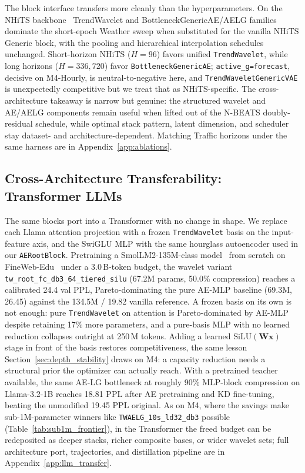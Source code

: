 \documentclass[11pt,a4paper]{article}
\begin{document}
The block interface transfers more cleanly than the hyperparameters. On the NHiTS backbone~\citep{challu2023nhits} TrendWavelet and BottleneckGenericAE/AELG families dominate the short-epoch Weather sweep when substituted for the vanilla NHiTS Generic block, with the pooling and hierarchical interpolation schedules unchanged. Short-horizon NHiTS ($H=96$) favors unified \texttt{TrendWavelet}, while long horizons ($H=336, 720$) favor \texttt{BottleneckGenericAE}; \texttt{active\_g=forecast}, decisive on M4-Hourly, is neutral-to-negative here, and \texttt{TrendWaveletGenericVAE} is unexpectedly competitive but we treat that as NHiTS-specific. The cross-architecture takeaway is narrow but genuine: the structured wavelet and AE/AELG components remain useful when lifted out of the N-BEATS doubly-residual schedule, while optimal stack pattern, latent dimension, and scheduler stay dataset- and architecture-dependent. Matching Traffic horizons under the same harness are in Appendix~\ref{app:ablations}.

\subsection{Cross-Architecture Transferability: Transformer LLMs}
\label{sec:transfer_llm}

The same blocks port into a Transformer with no change in shape. We replace each Llama attention projection with a frozen \texttt{TrendWavelet} basis on the input-feature axis, and the SwiGLU MLP with the same hourglass autoencoder used in our \texttt{AERootBlock}. Pretraining a SmolLM2-135M-class model~\citep{allal2025smollm2} from scratch on FineWeb-Edu~\citep{penedo2024fineweb} under a 3.0\,B-token budget, the wavelet variant \texttt{tw\_root\_fc\_db3\_64\_tiered\_silu} (67.2M params, 50.0\% compression) reaches a calibrated 24.4 val PPL, Pareto-dominating the pure AE-MLP baseline (69.3M, 26.45) against the 134.5M / 19.82 vanilla reference. A frozen basis on its own is not enough: pure \texttt{TrendWavelet} on attention is Pareto-dominated by AE-MLP despite retaining 17\% more parameters, and a pure-basis MLP with no learned reduction collapses outright at 250\,M tokens. Adding a learned $\mathrm{SiLU}(\mathbf{W}\mathbf{x})$ stage in front of the basis restores competitiveness, the same lesson Section~\ref{sec:depth_stability} draws on M4: a capacity reduction needs a structural prior the optimizer can actually reach. With a pretrained teacher available, the same AE-LG bottleneck at roughly 90\% MLP-block compression on Llama-3.2-1B reaches 18.81 PPL after AE pretraining and KD fine-tuning, beating the unmodified 19.45 PPL original. As on M4, where the savings make sub-1M-parameter winners like \texttt{TWAELG\_10s\_ld32\_db3} possible (Table~\ref{tab:sub1m_frontier}), in the Transformer the freed budget can be redeposited as deeper stacks, richer composite bases, or wider wavelet sets; full architecture port, trajectories, and distillation pipeline are in Appendix~\ref{app:llm_transfer}.
\end{document}
